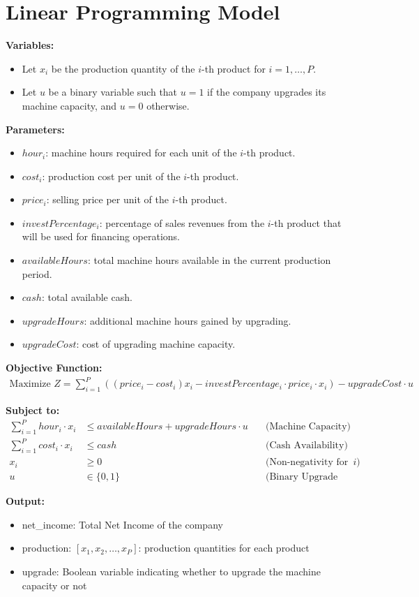 \documentclass{article}
\begin{document}
\section*{Linear Programming Model}

\textbf{Variables:}
\begin{itemize}
    \item Let $x_i$ be the production quantity of the $i$-th product for $i = 1, \dots, P$.
    \item Let $u$ be a binary variable such that $u = 1$ if the company upgrades its machine capacity, and $u = 0$ otherwise.
\end{itemize}

\textbf{Parameters:}
\begin{itemize}
    \item $hour_i$: machine hours required for each unit of the $i$-th product.
    \item $cost_i$: production cost per unit of the $i$-th product.
    \item $price_i$: selling price per unit of the $i$-th product.
    \item $investPercentage_i$: percentage of sales revenues from the $i$-th product that will be used for financing operations.
    \item $availableHours$: total machine hours available in the current production period.
    \item $cash$: total available cash.
    \item $upgradeHours$: additional machine hours gained by upgrading.
    \item $upgradeCost$: cost of upgrading machine capacity.
\end{itemize}

\textbf{Objective Function:}
\begin{align*}
\text{Maximize } Z = \sum_{i=1}^{P} \left( (price_i - cost_i) x_i - investPercentage_i \cdot price_i \cdot x_i \right) - upgradeCost \cdot u
\end{align*}

\textbf{Subject to:}
\begin{align*}
\sum_{i=1}^{P} hour_i \cdot x_i & \leq availableHours + upgradeHours \cdot u \quad & \text{(Machine Capacity)} \\
\sum_{i=1}^{P} cost_i \cdot x_i & \leq cash \quad & \text{(Cash Availability)} \\
x_i & \geq 0 \quad & \text{(Non-negativity for all } i) \\
u & \in \{0, 1\} \quad & \text{(Binary Upgrade Decision)}
\end{align*}

\textbf{Output:}
\begin{itemize}
    \item net\_income: Total Net Income of the company
    \item production: $[x_1, x_2, \ldots, x_P]$: production quantities for each product
    \item upgrade: Boolean variable indicating whether to upgrade the machine capacity or not
\end{itemize}
\end{document}
